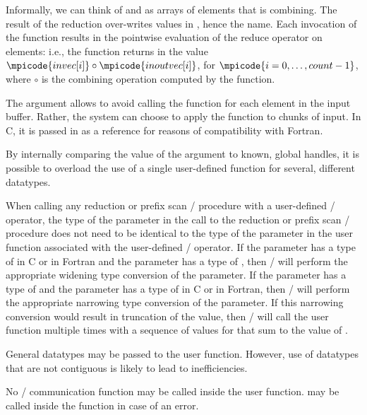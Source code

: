 Informally, we can think of
 and  as arrays of  elements that
is combining.  The result of the reduction over-writes values in
, hence the name.  Each invocation of the function results in
the pointwise evaluation of the reduce operator on 
elements:
i.e., the function returns in  the value
$\mpicode{invec[i]} \circ \mpicode{inoutvec[i]}$, for $\mpicode{i=0, \ldots , count-1}$,
where $\circ$ is the combining operation computed by the function.

\begin{rationale}
The
argument allows
 to avoid calling the function for each element
in the input buffer.  Rather, the system can choose to apply
the function to chunks of input.  In C, it is passed in as
a reference for reasons of compatibility with Fortran.

By internally comparing the value of the  argument to
known, global handles,
it is possible to overload the use of a single user-defined function
for several, different datatypes.
\end{rationale}

When calling any reduction or prefix scan \MPI/ procedure with a
user-defined \MPI/ operator, the type of the  parameter in
the call to the reduction or prefix scan \MPI/ procedure does not need
to be identical to the type of the  parameter in the user
function associated with the user-defined \MPI/ operator.  If the
 parameter has a type of  in C or
 in Fortran and the  parameter has a type
of , then \MPI/ will perform the appropriate widening
type conversion of the  parameter.  If the 
parameter has a type of  and the 
parameter has a type of  in C or  in
Fortran, then \MPI/ will perform the appropriate narrowing type
conversion of the  parameter.  If this narrowing
conversion would result in truncation of the  value, then
\MPI/ will call the user function multiple times with a sequence of
values for  that sum to the value of .

General datatypes may be passed to the user function.
However, use of datatypes that are not contiguous is likely to lead to
inefficiencies.

No \MPI/ communication function may be called inside the user function.
 may be called inside the
function in case of an error.

